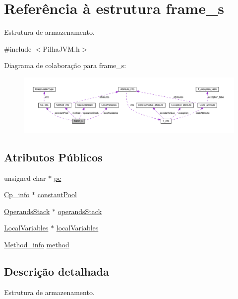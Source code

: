 \hypertarget{structframe__s}{}\section{Referência à estrutura frame\+\_\+s}
\label{structframe__s}


Estrutura de armazenamento.  




{\ttfamily \#include $<$Pilha\+J\+V\+M.\+h$>$}



Diagrama de colaboração para frame\+\_\+s\+:
\nopagebreak
\begin{figure}[H]
\begin{center}
\leavevmode
\includegraphics[width=350pt]{structframe__s__coll__graph}
\end{center}
\end{figure}
\subsection*{Atributos Públicos}
\begin{DoxyCompactItemize}
\item 
unsigned char $\ast$ \hyperlink{structframe__s_a74703c716b34b0be42af1c698ef9f621}{pc}
\item 
\hyperlink{structCp__info}{Cp\+\_\+info} $\ast$ \hyperlink{structframe__s_a87635828c425af2fef349dd22400fe99}{constant\+Pool}
\item 
\hyperlink{classOperandsStack}{Operands\+Stack} $\ast$ \hyperlink{structframe__s_ac26720ef0e7627d29c868eba6a15bfc1}{operands\+Stack}
\item 
\hyperlink{classLocalVariables}{Local\+Variables} $\ast$ \hyperlink{structframe__s_ab8c8d556e0b3a59ce604754a0e3634bb}{local\+Variables}
\item 
\hyperlink{structMethod__info}{Method\+\_\+info} \hyperlink{structframe__s_a9449132746fe7f38ff9048503b59065f}{method}
\end{DoxyCompactItemize}


\subsection{Descrição detalhada}
Estrutura de armazenamento. 


